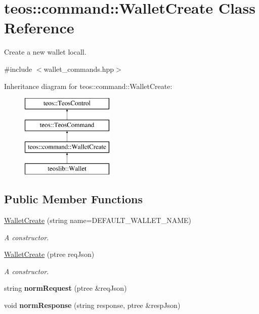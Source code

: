 \hypertarget{classteos_1_1command_1_1_wallet_create}{}\section{teos\+:\+:command\+:\+:Wallet\+Create Class Reference}
\label{classteos_1_1command_1_1_wallet_create}


Create a new wallet locall.  




{\ttfamily \#include $<$wallet\+\_\+commands.\+hpp$>$}

Inheritance diagram for teos\+:\+:command\+:\+:Wallet\+Create\+:\begin{figure}[H]
\begin{center}
\leavevmode
\includegraphics[height=4.000000cm]{classteos_1_1command_1_1_wallet_create}
\end{center}
\end{figure}
\subsection*{Public Member Functions}
\begin{DoxyCompactItemize}
\item 
\mbox{\hyperlink{classteos_1_1command_1_1_wallet_create_a78153f8e5eb577cdeb3734c7229df923}{Wallet\+Create}} (string name=D\+E\+F\+A\+U\+L\+T\+\_\+\+W\+A\+L\+L\+E\+T\+\_\+\+N\+A\+ME)
\begin{DoxyCompactList}\small\item\em A constructor. \end{DoxyCompactList}\item 
\mbox{\hyperlink{classteos_1_1command_1_1_wallet_create_a3a7979db66f2ea69186888d50dd6ce69}{Wallet\+Create}} (ptree req\+Json)
\begin{DoxyCompactList}\small\item\em A constructor. \end{DoxyCompactList}\item 
\mbox{\label{classteos_1_1command_1_1_wallet_create_aa95ee68f9139186395722e2028ec6309}} 
string {\bfseries norm\+Request} (ptree \&req\+Json)
\item 
\mbox{\label{classteos_1_1command_1_1_wallet_create_a419455a10d7be5d8264dbfe2bfdf511c}} 
void {\bfseries norm\+Response} (string response, ptree \&resp\+Json)
\end{DoxyCompactItemize}
